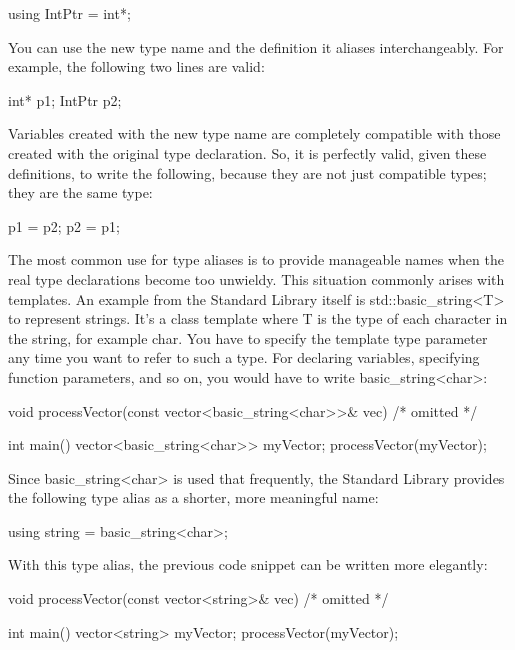 \begin{cpp}
using IntPtr = int*;
\end{cpp}

You can use the new type name and the definition it aliases interchangeably. For example, the following two lines are valid:

\begin{cpp}
int* p1;
IntPtr p2;
\end{cpp}

Variables created with the new type name are completely compatible with those created with the original type declaration. So, it is perfectly valid, given these definitions, to write the following, because they are not just compatible types; they are the same type:

\begin{cpp}
p1 = p2;
p2 = p1;
\end{cpp}

The most common use for type aliases is to provide manageable names when the real type declarations become too unwieldy. This situation commonly arises with templates. An example from the Standard Library itself is std::basic\_string<T> to represent strings. It’s a class template where T is the type of each character in the string, for example char. You have to specify the template type parameter any time you want to refer to such a type. For declaring variables, specifying function parameters, and so on, you would have to write basic\_string<char>:

\begin{cpp}
void processVector(const vector<basic_string<char>>& vec) { /* omitted */ }

int main()
{
    vector<basic_string<char>> myVector;
    processVector(myVector);
}
\end{cpp}

Since basic\_string<char> is used that frequently, the Standard Library provides the following type alias as a shorter, more meaningful name:

\begin{cpp}
using string = basic_string<char>;
\end{cpp}

With this type alias, the previous code snippet can be written more elegantly:

\begin{cpp}
void processVector(const vector<string>& vec) { /* omitted */ }

int main()
{
    vector<string> myVector;
    processVector(myVector);
}
\end{cpp}

